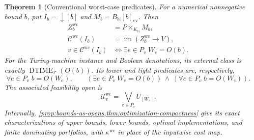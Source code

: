 \documentclass[11pt,a4paper]{article}
\numberwithin{algorithm}{section}
\numberwithin{equation}{section}
\newtheorem{theorem}{Theorem}[section]
\theoremstyle{definition}
\theoremstyle{remark}
\theoremstyle{plain}
\newcommand{\N}{\mathbb N}
\newcommand{\DTIME}{\operatorname{DTIME}}
\newcommand{\im}{\operatorname{im}}
\theoremstyle{definition}
\theoremstyle{plain}
\begin{document}
\begin{theorem}[Conventional worst-case predicates]
\label{thm:wc-classes}
For a numerical nonnegative bound $b$, put
$I_b=\downarrow[b]$ and $M_b=B_\N[b]_{\mathrm{ev}}$. Then
\begin{align*}
 Z_b^{\mathrm{wc}}&=P\times_{K_\N}M_b,\\
 \mathcal C^{\mathrm{wc}}(I_b)&=\im(Z_b^{\mathrm{wc}}\to V),\\
 v\in\mathcal C^{\mathrm{wc}}(I_b)
 &\Longleftrightarrow \exists e\in P_v\;W_e=O(b).
\end{align*}
For the Turing-machine instance and Boolean denotations, its external
class is exactly $\DTIME_{\mathcal T}(O(b))$. Its lower and tight
predicates are, respectively,
\[
 \forall e\in P_v\; b=O(W_e),
 \qquad
 (\exists e\in P_v\;W_e=O(b))\ \wedge\
 (\forall e\in P_v\;b=O(W_e)).
\]
The associated feasibility open is
\[
 \mathcal U_v^{\mathrm{wc}}=\bigvee_{e\in P_v}U_{[W_e]}.
\]
Internally, \cref{prop:bounds-as-opens,thm:optimization-compactness}
give its exact characterizations of upper bounds, lower bounds,
optimal implementations, and finite dominating portfolios, with
$\kappa^{\mathrm{wc}}$ in place of the inputwise cost map.
\end{theorem}
\end{document}
